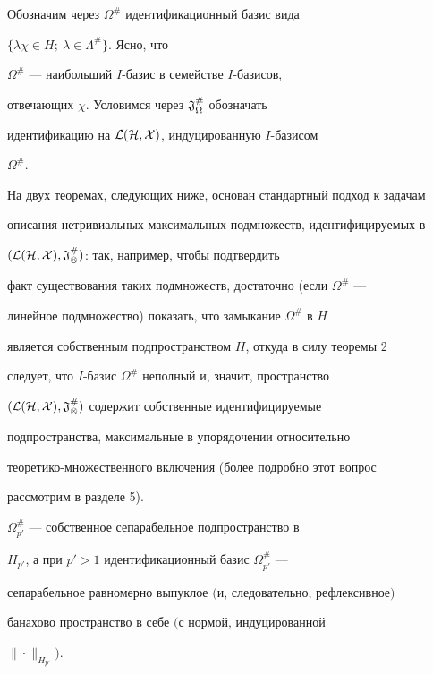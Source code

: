 Обозначим через $\Omega^{\#}$ идентификационный базис вида 


$\{\lambda\chi\in H;\ \lambda\in\Lambda^{\#}\}$. Ясно, что 


$\Omega^{\#}$ --- наибольший $I$-базис в семействе $I$-базисов, 


отвечающих $\chi$. Условимся через $\frak J^{\#}_\Omega$ обозначать 


идентификацию на $\cal L(H,X)$, индуцированную $I$-базисом 


$\Omega^{\#}$. 


 


На двух теоремах, следующих ниже, основан стандартный подход к задачам 


описания нетривиальных максимальных подмножеств, идентифицируемых в 


$(\cal L(H,X),\frak J^{\#}_\Omega)$: так, например, чтобы подтвердить 


факт существования таких подмножеств, достаточно (если $\Omega^{\#}$ --- 


линейное подмножество) показать, что замыкание $\Omega^{\#}$ в $H$ 


является собственным подпространством $H$, откуда в силу теоремы 2 


следует, что $I$-базис $\Omega^{\#}$ неполный и, значит, пространство 


$(\cal L(H,X),\frak J^{\#}_\Omega)$ содержит собственные идентифицируемые 


подпространства, максимальные в упорядочении относительно 


теоретико-множественного включения (более подробно этот вопрос 


рассмотрим в разделе 5). 


 


\begin{thm} 


$\Omega^{\#}_{p'}$ --- собственное сепарабельное подпространство в 


$H_{p'}$, а при $p'>1$ идентификационный базис $\Omega^{\#}_{p'}$ --- 


сепарабельное равномерно выпуклое $($и, следовательно, рефлексивное$)$ 


банахово пространство в себе $($с нормой, индуцированной 


$\|\cdot\|_{H_{p'}})$. 


\end{thm} 


